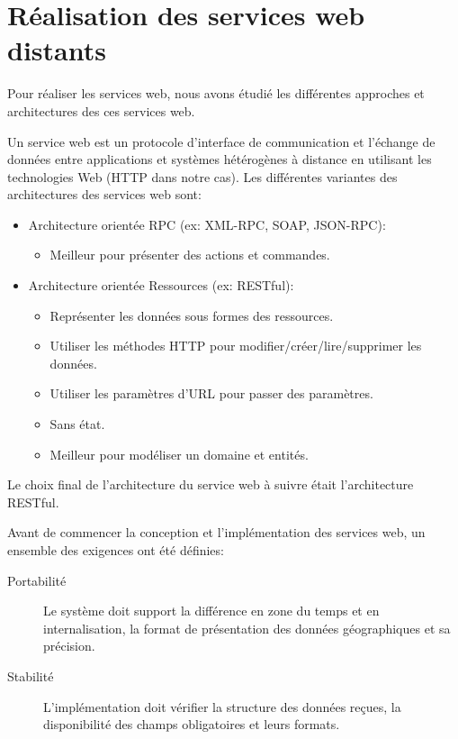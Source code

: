 \section{Réalisation des services web distants}

Pour réaliser les services web, nous avons étudié les différentes approches et
architectures des ces services web.

Un service web est un protocole d'interface de communication et l'échange de
données entre applications et systèmes hétérogènes à distance en utilisant les
technologies Web (HTTP dans notre cas). Les différentes variantes des
architectures des services web sont:

\begin{itemize}
    \item Architecture orientée RPC (ex: XML-RPC, SOAP, JSON-RPC):
        \begin{itemize}
            \item Meilleur pour présenter des actions et commandes.
        \end{itemize}
    \item Architecture orientée Ressources (ex: RESTful):
        \begin{itemize}
            \item Représenter les données sous formes des ressources.
            \item Utiliser les méthodes HTTP pour modifier/créer/lire/supprimer
                les données.
            \item Utiliser les paramètres d'URL pour passer des paramètres.
            \item Sans état.
            \item Meilleur pour modéliser un domaine et entités.
        \end{itemize}
\end{itemize}

Le choix final de l'architecture du service web à suivre était l'architecture
RESTful.

Avant de commencer la conception et l'implémentation des services web, un
ensemble des exigences ont été définies:

\begin{description}
    \item [Portabilité] Le système doit support la différence en zone du temps
        et en internalisation, la format de présentation des données
        géographiques et sa précision.
    \item [Stabilité] L'implémentation doit vérifier la structure des données
        reçues, la disponibilité des champs obligatoires et leurs formats.
\end{description}


